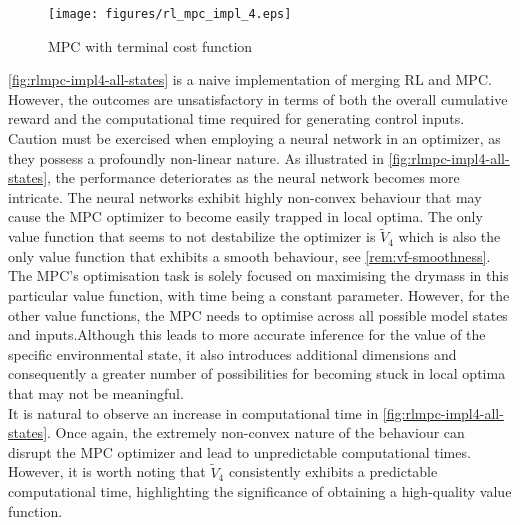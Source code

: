 \begin{figure}[H]
	\centering
	\texttt{[image: figures/rl\_mpc\_impl\_4.eps]}
	\caption{MPC with terminal cost function}
	\label{fig:rlmpc-impl4-all-states}
\end{figure}
\autoref{fig:rlmpc-impl4-all-states} is a naive implementation of merging RL and MPC. However, the outcomes are unsatisfactory in terms of both the overall cumulative reward and the computational time required for generating control inputs. Caution must be exercised when employing a neural network in an optimizer, as they possess a profoundly non-linear nature. As illustrated in \autoref{fig:rlmpc-impl4-all-states}, the performance deteriorates as the neural network becomes more intricate. The neural networks exhibit highly non-convex behaviour that may cause the MPC optimizer to become easily trapped in local optima. The only value function that seems to not destabilize the optimizer is $\tilde{V}_4$ which is also the only value function that exhibits a smooth behaviour, see \cref{rem:vf-smoothness}. The MPC's optimisation task is solely focused on maximising the drymass in this particular value function, with time being a constant parameter. However, for the other value functions, the MPC needs to optimise across all possible model states and inputs.Although this leads to more accurate inference for the value of the specific environmental state, it also introduces additional dimensions and consequently a greater number of possibilities for becoming stuck in local optima that may not be meaningful.\\
It is natural to observe an increase in computational time in \autoref{fig:rlmpc-impl4-all-states}. Once again, the extremely non-convex nature of the behaviour can disrupt the MPC optimizer and lead to unpredictable computational times. However, it is worth noting that $\tilde{V}_4$ consistently exhibits a predictable computational time, highlighting the significance of obtaining a high-quality value function.

